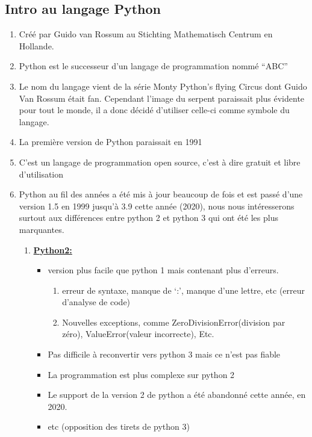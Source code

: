 \documentclass[a4paper, 12pt]{article}
\numberwithin{equation}{subsection}
\begin{document}
\subsection{Intro au langage Python}
\begin{enumerate}
  \item Créé par Guido van Rossum au Stichting Mathematisch Centrum en Hollande.
  \item Python est le successeur d’un langage de programmation nommé “ABC”
  \item Le nom du langage vient de la série Monty Python’s flying Circus dont Guido Van Rossum était fan. Cependant l’image du serpent paraissait plus évidente pour tout le monde, il a donc décidé d’utiliser celle-ci comme symbole du langage.
  \item La première version de Python paraissait en 1991
  \item C’est un langage de programmation open source, c’est à dire gratuit et libre d’utilisation
  \item Python au fil des années a été mis à jour beaucoup de fois et est passé d’une version 1.5 en 1999 jusqu’à 3.9 cette année (2020), nous nous intéresserons surtout aux différences entre python 2 et python 3 qui ont été les plus marquantes.
      \begin{enumerate}
          \item \underline{{\bf Python2: }}
              \begin{itemize}
                \item version plus facile que python 1 mais contenant plus d’erreurs.
                      \begin{enumerate}
                        \item erreur de syntaxe, manque de ‘:’, manque d’une lettre, etc (erreur d’analyse de code)
                        \item Nouvelles exceptions, comme ZeroDivisionError(division par zéro), ValueError(valeur incorrecte), Etc.
                      \end{enumerate}
                \item  Pas difficile à reconvertir vers python 3 mais ce n’est pas fiable
                \item La programmation est plus complexe sur python 2
                \item Le support de la version 2 de python a été abandonné cette année, en 2020.
                \item etc (opposition des tirets de python 3)

\end{itemize}
\end{enumerate}
\end{enumerate}
\end{document}
